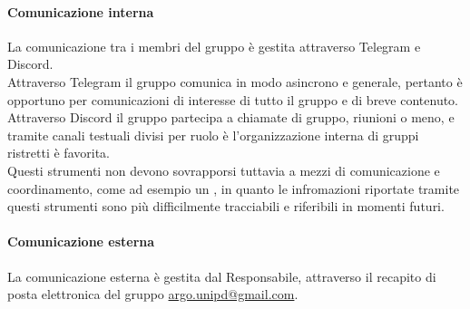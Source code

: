 \paragraph{Comunicazione interna}
La comunicazione tra i membri del gruppo è gestita attraverso Telegram e Discord.\\
Attraverso Telegram il gruppo comunica in modo asincrono e generale, pertanto è opportuno per comunicazioni di interesse di tutto il gruppo e di breve contenuto.\\
Attraverso Discord il gruppo partecipa a chiamate di gruppo, riunioni o meno, e tramite canali testuali divisi per ruolo è l'organizzazione interna di gruppi ristretti è favorita.\\
Questi strumenti non devono sovrapporsi tuttavia a mezzi di comunicazione e coordinamento, come ad esempio un , in quanto le infromazioni riportate tramite questi strumenti sono più difficilmente tracciabili e riferibili in momenti futuri.

\paragraph{Comunicazione esterna}
La comunicazione esterna è gestita dal Responsabile, attraverso il recapito di posta elettronica del gruppo \href{mailto:argo.unipd@gmail.com}{argo.unipd\-@\-gmail.com}.
